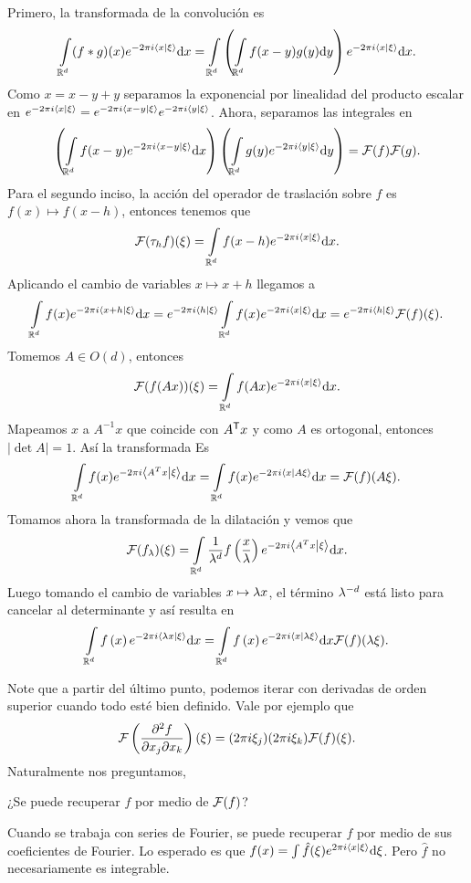 \documentclass[12pt]{memoir}
\begin{document}
\begin{ptcbp}
  Primero, la transformada de la convolución es 
  $$\int\limits_{\mathbb{R}^d}(f\ast g)(x)e^{-2\pi i\braket{x}{\xi}}\dd x=\int\limits_{\mathbb{R}^d}\left(\int\limits_{\mathbb{R}^d}f(x-y)g(y)\dd y\right)e^{-2\pi i\braket{x}{\xi}}\dd x.$$
  Como $x=x-y+y$ separamos la exponencial por linealidad del producto escalar en $e^{-2\pi i\braket{x}{\xi}}=e^{-2\pi i\braket{x-y}{\xi}}e^{-2\pi i\braket{y}{\xi}}$. 
  Ahora, separamos las integrales en 
  $$\left(\int\limits_{\mathbb{R}^d}f(x-y)e^{-2\pi i\braket{x-y}{\xi}}\dd x\right)\left(\int\limits_{\mathbb{R}^d}g(y)e^{-2\pi i\braket{y}{\xi}}\dd y\right)=\mathcal{F}(f)\mathcal{F}(g).$$
  Para el segundo inciso, la acción del operador de traslación sobre $f$ es $f(x)\mapsto f(x-h)$, entonces tenemos que
  $$\mathcal{F}(\tau_h f)(\xi)=\int\limits_{\mathbb{R}^d}f(x-h)e^{-2\pi i\braket{x}{\xi}}\dd x.$$
  Aplicando el cambio de variables $x\mapsto x+h$ llegamos a 
  $$\int\limits_{\mathbb{R}^d}f(x)e^{-2\pi i\braket{x+h}{\xi}}\dd x=e^{-2\pi i\braket{h}{\xi}}\int\limits_{\mathbb{R}^d}f(x)e^{-2\pi i\braket{x}{\xi}}\dd x=e^{-2\pi i\braket{h}{\xi}}\mathcal{F}(f)(\xi).$$
  Tomemos $A\in O(d)$, entonces 
  $$\mathcal{F}(f(Ax))(\xi)=\int\limits_{\mathbb{R}^d}f(Ax)e^{-2\pi i\braket{x}{\xi}}\dd x.$$
  Mapeamos $x$ a $A^{-1}x$ que coincide con $A^{\mathsf{T}} x$ y como $A$ es ortogonal, entonces $|\det A|=1$. Así la transformada Es
  $$\int\limits_{\mathbb{R}^d}f(x)e^{-2\pi i\braket{A^Tx}{\xi}}\dd x=\int\limits_{\mathbb{R}^d}f(x)e^{-2\pi i\braket{x}{A\xi}}\dd x=\mathcal{F}(f)(A\xi).$$
  Tomamos ahora la transformada de la dilatación y vemos que 
  $$\mathcal{F}(f_\lambda)(\xi)=\int\limits_{\mathbb{R}^d}\frac{1}{\lambda^d}f\left(\frac{x}{\lambda}\right)e^{-2\pi i\braket{A^Tx}{\xi}}\dd x.$$
  Luego tomando el cambio de variables $x\mapsto \lambda x$, el término $\lambda^{-d}$ está listo para cancelar al determinante y así resulta en 
  $$\int\limits_{\mathbb{R}^d}f\left(x\right)e^{-2\pi i\braket{\lambda x}{\xi}}\dd x=\int\limits_{\mathbb{R}^d}f\left(x\right)e^{-2\pi i\braket{x}{\lambda\xi}}\dd x\mathcal{F}(f)(\lambda\xi).$$
\end{ptcbp}
Note que a partir del último punto, podemos iterar con derivadas de orden superior cuando todo esté bien definido. Vale por ejemplo que
$$\mathcal{F}\left(\pdv[2]{f}{x_j}{x_k}\right)(\xi)=(2\pi i\xi_j)(2\pi i\xi_k)\mathcal{F}(f)(\xi).$$
Naturalmente nos preguntamos, 
\begin{significant}
  ¿Se puede recuperar $f$ por medio de $\mathcal{F}(f)$?
\end{significant}
Cuando se trabaja con series de Fourier, se puede recuperar $f$ por medio de sus coeficientes de Fourier. Lo esperado es que $f(x)=\int\hat{f}(\xi)e^{2\pi i\braket{x}{\xi}}\dd\xi$. Pero $\hat{f}$ no necesariamente es integrable.
\end{document}
